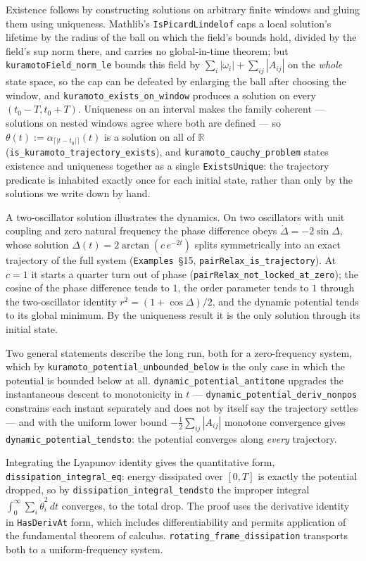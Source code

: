 \documentclass{article}
\begin{document}
Existence follows by constructing solutions on arbitrary finite windows and gluing them using uniqueness. Mathlib's \texttt{IsPicardLindelof} caps a local solution's lifetime by the radius of the ball on which the field's bounds hold, divided by the field's sup norm there, and carries no global-in-time theorem; but \nolinkurl{kuramotoField_norm_le} bounds this field by $\sum_i|\omega_i| + \sum_{ij}|A_{ij}|$ on the \emph{whole} state space, so the cap can be defeated by enlarging the ball after choosing the window, and \nolinkurl{kuramoto_exists_on_window} produces a solution on every $(t_0 - T, t_0 + T)$. Uniqueness on an interval makes the family coherent --- solutions on nested windows agree where both are defined --- so $\theta(t) := \alpha_{\lceil|t - t_0|\rceil}(t)$ is a solution on all of $\mathbb{R}$ (\nolinkurl{is_kuramoto_trajectory_exists}), and \nolinkurl{kuramoto_cauchy_problem} states existence and uniqueness together as a single \texttt{ExistsUnique}: the trajectory predicate is inhabited exactly once for each initial state, rather than only by the solutions we write down by hand.

A two-oscillator solution illustrates the dynamics. On two oscillators with unit coupling and zero natural frequency the phase difference obeys $\dot\Delta = -2\sin\Delta$, whose solution $\Delta(t) = 2\arctan(c\,e^{-2t})$ splits symmetrically into an exact trajectory of the full system (\texttt{Examples}~\S15, \nolinkurl{pairRelax_is_trajectory}). At $c=1$ it starts a quarter turn out of phase (\nolinkurl{pairRelax_not_locked_at_zero}); the cosine of the phase difference tends to $1$, the order parameter tends to $1$ through the two-oscillator identity $r^2 = (1+\cos\Delta)/2$, and the dynamic potential tends to its global minimum. By the uniqueness result it is the only solution through its initial state.

Two general statements describe the long run, both for a zero-frequency system, which by \nolinkurl{kuramoto_potential_unbounded_below} is the only case in which the potential is bounded below at all. \nolinkurl{dynamic_potential_antitone} upgrades the instantaneous descent to monotonicity in $t$ --- \nolinkurl{dynamic_potential_deriv_nonpos} constrains each instant separately and does not by itself say the trajectory settles --- and with the uniform lower bound $-\tfrac12\sum_{ij}|A_{ij}|$ monotone convergence gives \nolinkurl{dynamic_potential_tendsto}: the potential converges along \emph{every} trajectory.

Integrating the Lyapunov identity gives the quantitative form, \nolinkurl{dissipation_integral_eq}: energy dissipated over $[0,T]$ is exactly the potential dropped, so by \nolinkurl{dissipation_integral_tendsto} the improper integral $\int_0^\infty \sum_i \dot\theta_i^2\,dt$ converges, to the total drop. The proof uses the derivative identity in \texttt{HasDerivAt} form, which includes differentiability and permits application of the fundamental theorem of calculus. \nolinkurl{rotating_frame_dissipation} transports both to a uniform-frequency system.
\end{document}
